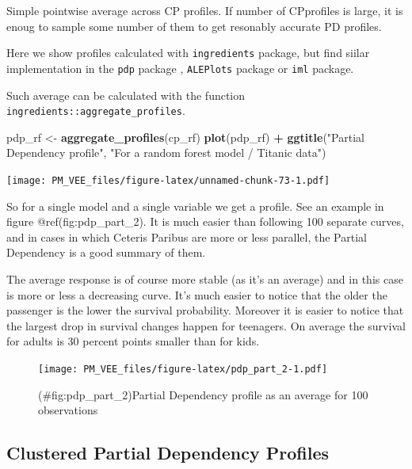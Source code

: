 \documentclass[12pt,]{krantz}
\newenvironment{Shaded}{\begin{snugshade}}{\end{snugshade}}
\newcommand{\KeywordTok}[1]{\textcolor[rgb]{0.13,0.29,0.53}{\textbf{#1}}}
\newcommand{\NormalTok}[1]{#1}
\newcommand{\OperatorTok}[1]{\textcolor[rgb]{0.81,0.36,0.00}{\textbf{#1}}}
\newcommand{\StringTok}[1]{\textcolor[rgb]{0.31,0.60,0.02}{#1}}
\begin{document}
Simple pointwise average across CP profiles. If number of CPprofiles is large, it is enoug to sample some number of them to get resonably accurate PD profiles.

Here we show profiles calculated with \texttt{ingredients} package, but find siilar implementation in the \texttt{pdp} package \citep{pdp}, \texttt{ALEPlots} package \citep{R-ALEPlot} or \texttt{iml} \citep{iml} package.

Such average can be calculated with the function \texttt{ingredients::aggregate\_profiles}.

\begin{Shaded}
\begin{Highlighting}[]
\NormalTok{pdp_rf <-}\StringTok{ }\KeywordTok{aggregate_profiles}\NormalTok{(cp_rf)}
\KeywordTok{plot}\NormalTok{(pdp_rf) }\OperatorTok{+}
\StringTok{  }\KeywordTok{ggtitle}\NormalTok{(}\StringTok{"Partial Dependency profile"}\NormalTok{, }\StringTok{"For a random forest model / Titanic data"}\NormalTok{) }
\end{Highlighting}
\end{Shaded}

\texttt{[image: PM\_VEE\_files/figure-latex/unnamed-chunk-73-1.pdf]}

So for a single model and a single variable we get a profile. See an example in figure @ref(fig:pdp\_part\_2). It is much easier than following 100 separate curves, and in cases in which Ceteris Paribus are more or less parallel, the Partial Dependency is a good summary of them.

The average response is of course more stable (as it's an average) and in this case is more or less a decreasing curve. It's much easier to notice that the older the passenger is the lower the survival probability.
Moreover it is easier to notice that the largest drop in survival changes happen for teenagers. On average the survival for adults is 30 percent points smaller than for kids.

\begin{figure}
\centering
\texttt{[image: PM\_VEE\_files/figure-latex/pdp\_part\_2-1.pdf]}
\caption{(\#fig:pdp\_part\_2)Partial Dependency profile as an average for 100 observations}
\end{figure}

\hypertarget{clustered-partial-dependency-profiles}{%
\subsection{Clustered Partial Dependency Profiles}\label{clustered-partial-dependency-profiles}}
\end{document}
